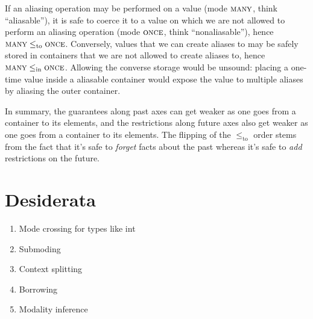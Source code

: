 \documentclass{article}
\newcommand{\leqto}{\mathrel{\leq_{\mathrm{to}}}}
\newcommand{\leqin}{\mathrel{\leq_{\mathrm{in}}}}
\newcommand{\mode}[1]{\textsc{#1}}
\begin{document}
If an aliasing operation may be performed on a value (mode $\mode{many}$, think ``aliasable''), it is safe to coerce it to a value on which we are not allowed to perform an aliasing operation (mode $\mode{once}$, think ``nonaliasable''), hence $\mode{many} \leqto \mode{once}$.
Conversely, values that we can create aliases to may be safely stored in containers that we are not allowed to create aliases to, hence $\mode{many} \leqin \mode{once}$.
Allowing the converse storage would be unsound: placing a one-time value inside a aliasable container would expose the value to multiple aliases by aliasing the outer container.

In summary, the guarantees along past axes can get weaker as one goes from a container to its elements, and the restrictions along future axes also get weaker as one goes from a container to its elements.
The flipping of the $\leqto$ order stems from the fact that it's safe to \emph{forget} facts about the past whereas it's safe to \emph{add} restrictions on the future.

\section{Desiderata}

\begin{enumerate}
  \item Mode crossing for types like int
  \item Submoding
  \item Context splitting
  \item Borrowing
  \item Modality inference
\end{enumerate}
\end{document}
